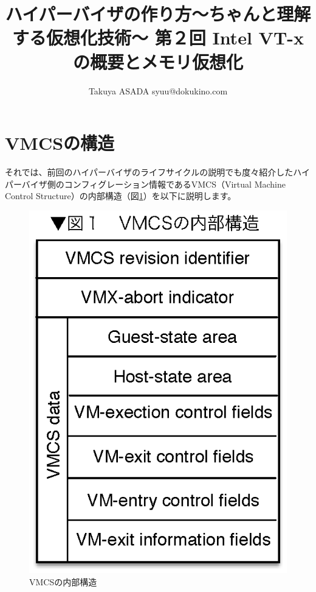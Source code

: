 
\title{ハイパーバイザの作り方～ちゃんと理解する仮想化技術～ 第２回 Intel VT-xの概要とメモリ仮想化}
\author{Takuya ASADA syuu@dokukino.com}

\maketitle

\section{VMCSの構造}
それでは、前回のハイパーバイザのライフサイクルの説明でも度々紹介したハイパーバイザ側のコンフィグレーション情報であるVMCS（Virtual Machine Control Structure）の内部構造（図\ref{fig1}）を以下に説明します。

\begin{figure}\centering
\includegraphics{figures/part2_fig1.eps}
\caption{VMCSの内部構造}
\label{fig1}
\end{figure}

